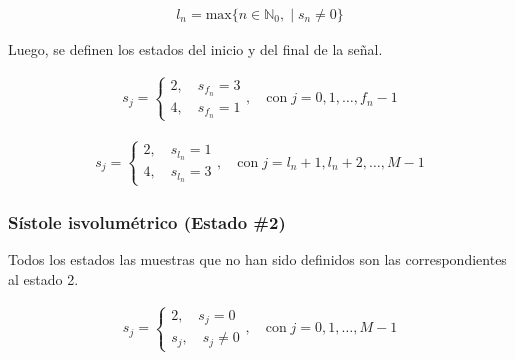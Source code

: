 \begin{align} \label{eq:max-index}
  l_n = \mathrm{max}\big\{ n \in \mathbb{N}_0, \; | \; s_n \neq 0  \big\}
\end{align}

\indent Luego, se definen los estados del inicio y del final de la señal.

\begin{align}
  s_j = \begin{cases}
    2, \quad s_{f_n} = 3  \\
    4, \quad s_{f_n} = 1
  \end{cases}, \quad \mathrm{con} \; j = 0,1,\dots,f_n-1
\end{align}

\begin{align}
  s_j = \begin{cases}
    2, \quad s_{l_n} = 1  \\
    4, \quad s_{l_n} = 3
  \end{cases}, \quad \mathrm{con} \; j = l_n+1,l_n+2,\dots,M-1
\end{align}

\subsubsection*{Sístole isvolumétrico (Estado \#2)}

\indent Todos los estados las muestras que no han sido definidos son las correspondientes al estado 2.

\begin{align}
  s_j = \begin{cases}
    2, \quad s_j = 0  \\
    s_j, \quad s_j \neq 0
  \end{cases}, \quad \mathrm{con} \; j = 0,1,\dots,M-1
\end{align}

